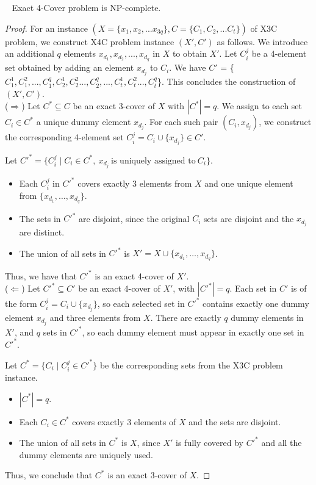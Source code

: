 \documentclass[10pt,a4paper]{amsart}
\newcommand{\xfc}{{\sc Exact 4-Cover}}
\begin{document}
\begin{lemma}~\label{x4cproof}
    \xfc{} problem is NP-complete.
\end{lemma}

\begin{proof}
    For an instance $(X = \{x_1,x_2,...x_{3q}\}, C = \{C_1,C_2,...C_t\})$ of X3C problem, we construct X4C problem instance $(X', C')$ as follows. We introduce an additional $q$ elements $x_{d_1}, x_{d_2},...,x_{d_q}$ in $X$ to obtain $X'$. Let $C_i^j$ be a 4-element set obtained by adding an element $x_{d_j}$ to $C_i$. We have $C'$ = \{$C_{1}^1, C_{1}^2 ,..., C_{1}^q, C_{2}^1,C_{2}^2 ..., C_{2}^q, ..., C_{t}^1,C_{t}^2 ..., C_{t}^q$\}. This concludes the construction of $(X', C')$. \\

\noindent ($\Rightarrow$) Let $C^* \subseteq C$ be an exact 3-cover of $X$ with $|C^*| = q$. We assign to each set $C_i \in C^*$ a unique dummy element $x_{d_j}$. For each such pair $(C_i, x_{d_j})$, we construct the corresponding 4-element set $C_i^j = C_i \cup \{x_{d_j}\} \in C'$.

Let $C'^* = \{C_i^j \mid C_i \in C^*,\ x_{d_j}\ \text{is uniquely assigned to}\ C_i\}$.

\begin{itemize}
    \item Each $C_i^j$ in $C'^*$ covers exactly 3 elements from $X$ and one unique element from $\{x_{d_1}, \dots, x_{d_q}\}$.
    \item The sets in $C'^*$ are disjoint, since the original $C_i$ sets are disjoint and the $x_{d_j}$ are distinct.
    \item The union of all sets in $C'^*$ is $X' = X \cup \{x_{d_1}, \dots, x_{d_q}\}$.
\end{itemize}

Thus, we have that $C'^*$ is an exact 4-cover of $X'$. \\

\noindent ($\Leftarrow$) Let $C'^* \subseteq C'$ be an exact 4-cover of $X'$, with $|C'^*| = q$. Each set in $C'$ is of the form $C_i^j = C_i \cup \{x_{d_j}\}$, so each selected set in $C'^*$ contains exactly one dummy element $x_{d_j}$ and three elements from $X$. There are exactly $q$ dummy elements in $X'$, and $q$ sets in $C'^*$, so each dummy element must appear in exactly one set in $C'^*$.

Let $C^* = \{C_i \mid C_i^j \in C'^*\}$ be the corresponding sets from the X3C problem instance.

\begin{itemize}
    \item $|C^*| = q$.
    \item Each $C_i \in C^*$ covers exactly 3 elements of $X$ and the sets are disjoint.
    \item The union of all sets in $C^*$ is $X$, since $X'$ is fully covered by $C'^*$ and all the dummy elements are uniquely used.
\end{itemize}

Thus, we conclude that $C^*$ is an exact 3-cover of $X$.
\end{proof}
\end{document}

